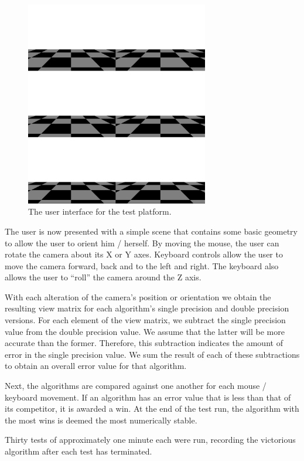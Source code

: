 \documentclass{acm_proc_article-sp}
\begin{document}
\begin{figure}
\begin{framed}
\includegraphics[width=8cm]{user_interface.png}
\caption{The user interface for the test platform.}
\end{framed}
\end{figure}

The user is now presented with a simple scene that contains some basic geometry to allow the user to orient him / herself.
By moving the mouse, the user can rotate the camera about its X or Y axes.
Keyboard controls allow the user to move the camera forward, back and to the left and right.
The keyboard also allows the user to ``roll'' the camera around the Z axis.

With each alteration of the camera's position or orientation we obtain the resulting view matrix for each algorithm's single precision and double precision versions.
For each element of the view matrix, we subtract the single precision value from the double precision value.
We assume that the latter will be more accurate than the former.
Therefore, this subtraction indicates the amount of error in the single precision value.
We sum the result of each of these subtractions to obtain an overall error value for that algorithm.

Next, the algorithms are compared against one another for each mouse / keyboard movement.
If an algorithm has an error value that is less than that of its competitor, it is awarded a win.
At the end of the test run, the algorithm with the most wins is deemed the most numerically stable.

Thirty tests of approximately one minute each were run, recording the victorious algorithm after each test has terminated.
\end{document}
